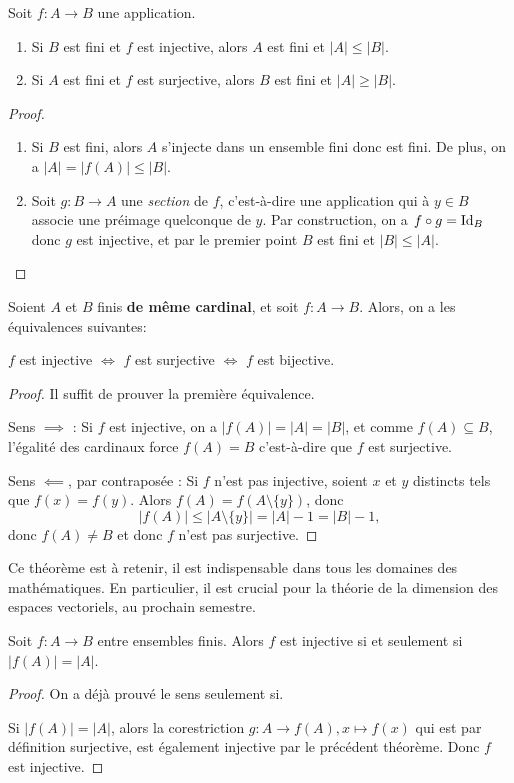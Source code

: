 \begin{proposition}
Soit $f : A\to B$ une application.
\begin{enumerate}
\item Si $B$ est fini et $f$ est injective, alors $A$ est fini et $|A|\leq |B|$.
\item Si $A$ est fini et $f$ est surjective, alors $B$ est fini et $|A|\geq |B|$.
\end{enumerate}
\end{proposition}
\begin{proof}
\begin{enumerate}
\item Si $B$ est fini, alors $A$ s'injecte dans un ensemble fini donc est fini. De plus, on a $|A|=|f(A)|\leq |B|$.
\item Soit $g:B\to A$ une \emph{section} de $f$, c'est-à-dire une application  qui à $y\in B$ associe une préimage quelconque de $y$. Par construction, on a $f\circ g=\operatorname{Id}_{B}$ donc $g$ est injective, et par le premier point $B$ est fini et $|B| \leq |A|$.
\end{enumerate}
\end{proof}

\begin{theoreme}[IMPORTANT]
Soient $A$ et $B$ finis \textbf{de même cardinal}, et soit $f : A\to B$. Alors, on a les équivalences suivantes:
\begin{center}
$f$ est injective $\iff$ $f$ est surjective $\iff$ $f$ est  bijective.
\end{center}
\end{theoreme}
\begin{proof}
Il suffit de prouver la première équivalence.

Sens $\implies$ : Si $f$ est injective, on a $|f(A)|=|A|=|B|$, et comme $f(A)\subseteq B$, l'égalité des cardinaux force $f(A)=B$ c'est-à-dire que $f$ est surjective.

Sens $\impliedby$, par contraposée : Si $f$ n'est pas injective, soient $x$ et $y$ distincts tels que $f(x)=f(y)$. Alors $f(A) = f(A\setminus \{y\})$, donc 
\[
|f(A)| \leq |A\setminus \{y\}| = |A|-1 = |B|-1,
\]
donc $f(A) \neq B$ et donc $f$ n'est pas surjective.
\end{proof}

Ce théorème est à retenir, il est indispensable dans tous les domaines des mathématiques. En particulier, il est crucial pour la théorie de la dimension des espaces vectoriels, au prochain semestre.

\begin{corollaire}
Soit $f : A\to B$ entre ensembles finis. Alors $f$ est injective si et seulement si $|f(A)|=|A|$.
\end{corollaire}
\begin{proof}On a déjà prouvé le sens \og seulement si\fg.

Si $|f(A)|=|A|$, alors la corestriction $g : A\to f(A), x\mapsto f(x)$ qui est par définition surjective, est également injective par le précédent théorème. Donc $f$ est injective.
\end{proof}



